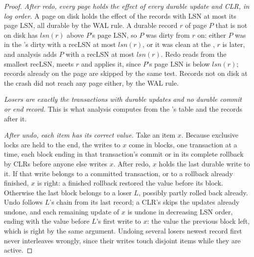 \begin{proof}
\emph{After redo, every page holds the effect of every durable update and CLR, in log order.} A page on disk holds the effect of the records with LSN at most its page LSN, all durable by the WAL rule. A durable record $r$ of page $P$ that is not on disk has $\mathit{lsn}(r)$ above $P$'s page LSN, so $P$ was dirty from $r$ on: either $P$ was in the 's dirty  with a recLSN at most $\mathit{lsn}(r)$, or it was clean at the , $r$ is later, and analysis adds $P$ with a recLSN at most $\mathit{lsn}(r)$. Redo reads from the smallest recLSN, meets $r$ and applies it, since $P$'s page LSN is below $\mathit{lsn}(r)$; records already on the page are skipped by the same test. Records not on disk at the crash did not reach any page either, by the WAL rule.

\emph{Losers are exactly the transactions with durable updates and no durable commit or end record.} This is what analysis computes from the 's table and the records after it.

\emph{After undo, each item has its correct value.} Take an item $x$. Because exclusive locks are held to the end, the writes to $x$ come in blocks, one transaction at a time, each block ending in that transaction's commit or in its complete rollback by CLRs before anyone else writes $x$. After redo, $x$ holds the last durable write to it. If that write belongs to a committed transaction, or to a rollback already finished, $x$ is right: a finished rollback restored the value before its block. Otherwise the last block belongs to a loser $L$, possibly partly rolled back already. Undo follows $L$'s chain from its last record; a CLR's  skips the updates already undone, and each remaining update of $x$ is undone in decreasing LSN order, ending with the value before $L$'s first write to $x$: the value the previous block left, which is right by the same argument. Undoing several losers newest record first never interleaves wrongly, since their writes touch disjoint items while they are active.
\end{proof}

\label{out:b3:transactions-and-recovery:trace}

